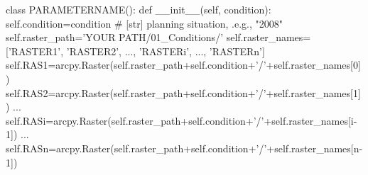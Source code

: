 \begin{python}
class PARAMETERNAME():
  def __init__(self, condition):
    self.condition=condition  # [str] planning situation, .e.g., "2008"
    self.raster_path='YOUR PATH/01_Conditions/'
    self.raster_names=['RASTER1', 'RASTER2', ..., 'RASTERi', ..., 'RASTERn']
    self.RAS1=arcpy.Raster(self.raster_path+self.condition+'/'+self.raster_names[0])
    self.RAS2=arcpy.Raster(self.raster_path+self.condition+'/'+self.raster_names[1])
    ...
    self.RASi=arcpy.Raster(self.raster_path+self.condition+'/'+self.raster_names[i-1])
    ...
    self.RASn=arcpy.Raster(self.raster_path+self.condition+'/'+self.raster_names[n-1])
\end{python}

\clearpage
